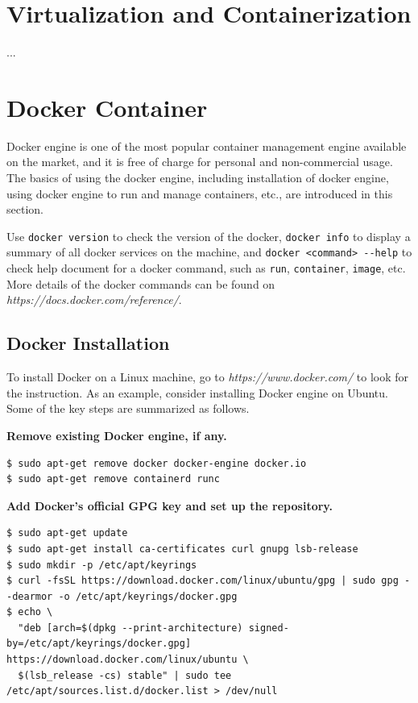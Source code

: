 \section{Virtualization and Containerization}
...

\section{Docker Container} \label{ch:vac:sec:dc}

Docker engine is one of the most popular container management engine available on the market, and it is free of charge for personal and non-commercial usage. The basics of using the docker engine, including installation of docker engine, using docker engine to run and manage containers, etc., are introduced in this section.

Use \verb|docker version| to check the version of the docker, \verb|docker info| to display a summary of all docker services on the machine, and \verb|docker <command> --help| to check help document for a docker command, such as \verb|run|, \verb|container|, \verb|image|, etc. More details of the docker commands can be found on \textit{https://docs.docker.com/reference/}.

\subsection{Docker Installation}

To install Docker on a Linux machine, go to \textit{https://www.docker.com/} to look for the instruction. As an example, consider installing Docker engine on Ubuntu. Some of the key steps are summarized as follows.

\vspace{0.1in}
\noindent \textbf{Remove existing Docker engine, if any.}
\begin{lstlisting}
$ sudo apt-get remove docker docker-engine docker.io
$ sudo apt-get remove containerd runc
\end{lstlisting}

\vspace{0.1in}
\noindent \textbf{Add Docker's official GPG key and set up the repository.}
\begin{lstlisting}
$ sudo apt-get update
$ sudo apt-get install ca-certificates curl gnupg lsb-release
$ sudo mkdir -p /etc/apt/keyrings
$ curl -fsSL https://download.docker.com/linux/ubuntu/gpg | sudo gpg --dearmor -o /etc/apt/keyrings/docker.gpg
$ echo \
  "deb [arch=$(dpkg --print-architecture) signed-by=/etc/apt/keyrings/docker.gpg] https://download.docker.com/linux/ubuntu \
  $(lsb_release -cs) stable" | sudo tee /etc/apt/sources.list.d/docker.list > /dev/null
\end{lstlisting}

